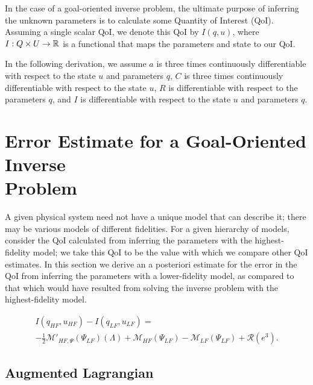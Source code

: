 In the case of a goal-oriented inverse problem, the ultimate purpose of inferring the unknown parameters is to calculate some Quantity of Interest (QoI). Assuming a single scalar QoI, we denote this QoI by $I(q,u)$, where $I:Q\times U\to{\mathbb{R}}$ is a functional that maps the parameters and state to our QoI.

In the following derivation, we assume $a$ is three times continuously differentiable with respect to the state $u$ and parameters $q$, $C$ is three times continuously differentiable with respect to the state $u$, $R$ is differentiable with respect to the parameters $q$, and $I$ is differentiable with respect to the state $u$ and parameters $q$.

\section[Error Estimate for a Goal-Oriented Inverse Problem]{Error Estimate for a Goal-Oriented Inverse \\Problem}  \label{sec:deriv}

A given physical system need not have a unique model that can describe it; there may be various models of different fidelities. For a given hierarchy of models, consider the QoI calculated from inferring the parameters with the highest-fidelity model; we take this QoI to be the value with which we compare other QoI estimates. In this section we derive an a posteriori estimate for the error in the QoI from inferring the parameters with a lower-fidelity model, as compared to that which would have resulted from solving the inverse problem with the highest-fidelity model.
%
\begin{theorem}
\label{thm:error_estimate}
\begin{multline}
I(q_{HF},u_{HF})-I(q_{LF},u_{LF})=\\-\frac{1}{2}\mathcal{M}'_{HF,\Psi}(\Psi_{LF})(\Lambda)+\mathcal M_{HF}(\Psi_{LF})-\mathcal M_{LF}(\Psi_{LF})+\mathcal{R}(e^3).
\label{eq:finErrExp}
\end{multline}
\end{theorem}
%



\subsection{Augmented Lagrangian} \label{sec:augLag}

